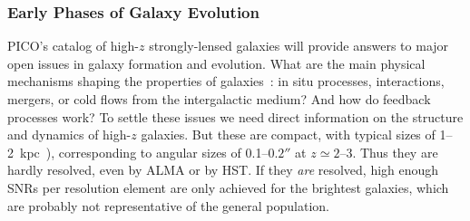 \documentclass[PICOReport.tex]{subfiles}
\begin{document}

\subsubsection{Early Phases of Galaxy Evolution}


PICO's catalog of high-$z$ strongly-lensed galaxies will provide answers to major open issues in galaxy formation and evolution. What are the main physical mechanisms shaping the properties of galaxies~\citep{SilkMamon2012, SomervilleDave2015}: in situ processes, interactions, mergers, or cold flows  from the intergalactic medium? And how do feedback processes work? To settle these issues we need direct information on the structure and dynamics of high-$z$ galaxies. But these are compact, with typical sizes of 1--2~kpc~\cite{Fujimoto2018}), corresponding to angular sizes of 0.1--$0.2''$ at $z\simeq 2$--3. Thus they are hardly resolved, even by ALMA or by HST. If they {\it are} resolved, high enough \ac{SNR}s per resolution element are only achieved for the brightest galaxies, which are probably not representative of the general population.
\end{document}
